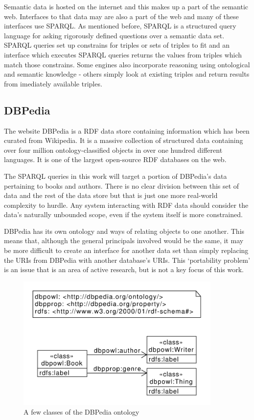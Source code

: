 \documentclass[11pt]{article}
\begin{document}
Semantic data is hosted on the internet and this makes up a part of the semantic web.
Interfaces to that data may are also a part of the web and many of these interfaces
use SPARQL. As mentioned before, SPARQL is a structured query language for asking
rigorously defined questions over a semantic data set. SPARQL queries set up constrains
for triples or sets of triples to fit and an interface which executes SPARQL queries
returns the values from triples which match those constrains. Some engines also
incorporate reasoning using ontological and semantic knowledge - others simply look
at existing triples and return results from imediately available triples.

\subsection{DBPedia}

The website DBPedia\cite{dbpedia,dbpedia-swj} is a RDF data store containing information 
which has been curated from Wikipedia. It is a massive collection of structured data
containing over four million ontology-classified objects in over one hundred different
languages. It is one of the largest open-source RDF databases on the web.

The SPARQL queries in this work will target a portion of DBPedia's
data pertaining to books and authors. There is no clear division between this set of
data and the rest of the data store but that is just one more real-world complexity
to hurdle. Any system interacting with RDF data should consider
the data's naturally unbounded scope, even if the system itself is more constrained.

DBPedia has its own ontology and ways of relating objects to one another. This means
that, although the general principals involved would be the same, 
it may be more difficult to create an interface for another data set than simply 
replacing the URIs from DBPedia with another database's URIs. This `portability problem'
is an issue that is an area of active research\cite{issues, usability}, 
but is not a key focus of this work.

\begin{figure}[h!]
    \centering
    \includegraphics[width=0.9\textwidth,natwidth=1,natheight=1]{umlet/book_ontology.pdf}
    \caption{A few classes of the DBPedia ontology}
    \label{fig:book_ontology}
\end{figure}
\end{document}
